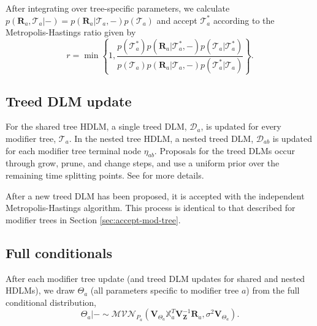 \documentclass[12pt]{article}
\begin{document}
After integrating over tree-specific parameters, we calculate $p(\mathbf{R}_a,\mathcal{T}_{a}|-)=p(\mathbf{R}_a|\mathcal{T}_{a},-)p(\mathcal{T}_{a})$ and accept $\mathcal{T}_{a}^*$ according to the Metropolis-Hastings ratio given by
\begin{equation}\label{eq:single_mh}
r=\min\left\{1,\frac{p(\mathcal{T}_{a}^*)p(\mathbf{R}_a|\mathcal{T}_{a}^*,-)p(\mathcal{T}_{a}\vert\mathcal{T}_{a}^*)}{p(\mathcal{T}_{a})p(\mathbf{R}_a|\mathcal{T}_{a},-)p(\mathcal{T}_{a}^*\vert \mathcal{T}_{a})}\right\}.
\end{equation}



\subsection{Treed DLM update}
For the shared tree HDLM, a single treed DLM, $\mathcal{D}_a$, is updated for every modifier tree, $\mathcal{T}_a$. In the nested tree HDLM, a nested treed DLM, $\mathcal{D}_{ab}$ is updated for each modifier tree terminal node $\eta_{ab}$. Proposals for the treed DLMs occur through grow, prune, and change steps, and use a uniform prior over the remaining time splitting points. See \cite{Mork2022EstimatingPairs} for more details.

After a new treed DLM has been proposed, it is accepted with the independent Metropolis-Hastings algorithm. This process is identical to that described for modifier trees in Section \ref{sec:accept-mod-tree}.



\subsection{Full conditionals}
After each modifier tree update (and treed DLM updates for shared and nested HDLMs), we draw $\Theta_a$ (all parameters specific to modifier tree $a$) from the full conditional distribution,
\begin{equation}\label{eq:mu-posterior}
    \Theta_a|-\sim \mathcal{MVN}_{P_a}\left(\mathbf{V}_{\Theta_a}\mathbb{X}_a^T \mathbf{V}_\mathbf{Z}^{-1}\mathbf{R}_a,\sigma^2 \mathbf{V}_{\Theta_a}\right).
\end{equation}
\end{document}
